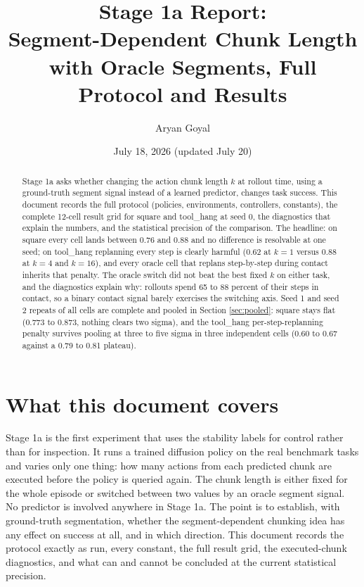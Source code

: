 \documentclass[11pt]{article}
\title{Stage 1a Report:\\ \large Segment-Dependent Chunk Length with Oracle Segments, Full Protocol and Results}
\author{Aryan Goyal}
\date{July 18, 2026 (updated July 20)}
\begin{document}
\maketitle

\begin{abstract}
\noindent
Stage 1a asks whether changing the action chunk length $k$ at rollout time, using a
ground-truth segment signal instead of a learned predictor, changes task success.
This document records the full protocol (policies, environments, controllers,
constants), the complete 12-cell result grid for square and tool\_hang at seed 0,
the diagnostics that explain the numbers, and the statistical precision of the
comparison. The headline: on square every cell lands between 0.76 and 0.88 and no
difference is resolvable at one seed; on tool\_hang replanning every step is clearly
harmful (0.62 at $k{=}1$ versus 0.88 at $k{=}4$ and $k{=}16$), and every oracle cell
that replans step-by-step during contact inherits that penalty. The oracle switch
did not beat the best fixed $k$ on either task, and the diagnostics explain why:
rollouts spend 65 to 88 percent of their steps in contact, so a binary contact
signal barely exercises the switching axis. Seed 1 and seed 2 repeats of all
cells are complete and pooled in Section \ref{sec:pooled}: square stays flat
(0.773 to 0.873, nothing clears two sigma), and the tool\_hang per-step-replanning
penalty survives pooling at three to five sigma in three independent cells
(0.60 to 0.67 against a 0.79 to 0.81 plateau).
\end{abstract}

\tableofcontents
\newpage

\section{What this document covers}

Stage 1a is the first experiment that uses the stability labels for control rather
than for inspection. It runs a trained diffusion policy on the real benchmark tasks
and varies only one thing: how many actions from each predicted chunk are executed
before the policy is queried again. The chunk length is either fixed for the whole
episode or switched between two values by an oracle segment signal. No predictor is
involved anywhere in Stage 1a. The point is to establish, with ground-truth
segmentation, whether the segment-dependent chunking idea has any effect on success
at all, and in which direction. This document records the protocol exactly as run,
every constant, the full result grid, the executed-chunk diagnostics, and what can
and cannot be concluded at the current statistical precision.
\end{document}
